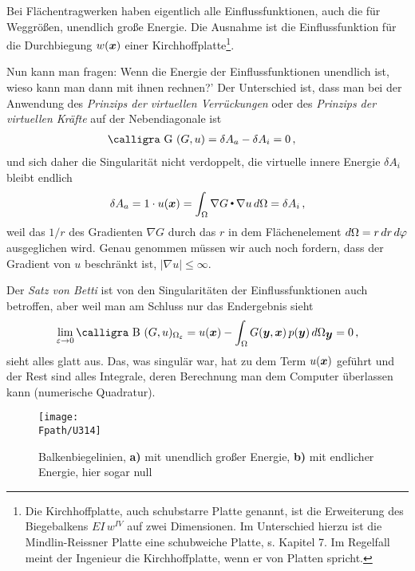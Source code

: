{{{{{Bei Fl\"{a}chentragwerken haben eigentlich alle Einflussfunktionen, auch die f\"{u}r Weggr\"{o}{\ss}en, unendlich gro{\ss}e Energie. Die Ausnahme ist die Einflussfunktion f\"{u}r die Durchbiegung $w(\mbox{\boldmath $x$})$ einer Kirchhoffplatte\footnote{Die Kirchhoffplatte, auch schubstarre Platte genannt, ist die Erweiterung des Biegebalkens $EI\,w^{IV}$ auf zwei Dimensionen. Im Unterschied hierzu ist die Mindlin-Reissner Platte eine schubweiche Platte, s. Kapitel 7. Im Regelfall meint der Ingenieur die Kirchhoffplatte, wenn er von Platten spricht. }.

Nun kann man fragen: \glq Wenn die Energie der Einflussfunktionen unendlich ist, wieso kann man dann mit ihnen rechnen?' Der Unterschied ist, dass man bei der Anwendung des {\em Prinzips der virtuellen Verr\"{u}ckungen\/} oder des {\em Prinzips der virtuellen Kr\"{a}fte\/} auf der { Nebendiagonale} ist
\begin{align}
\text{\normalfont\calligra G\,\,}(G,u) &= \delta A_a - \delta A_i = 0\,,
\end{align}
und sich daher die Singularit\"{a}t nicht verdoppelt, die virtuelle innere Energie $\delta A_i$ bleibt endlich
\begin{align}
\delta A_a = 1 \cdot u(\mbox{\boldmath $x$}) = \int_{\Omega}  \nabla G {\,\scriptscriptstyle \stackrel{\bullet}{{}}}\,  \nabla u \,d\Omega = \delta A_i\,,
\end{align}
weil das $1/r$ des Gradienten $\nabla G$ durch das $r$ in dem Fl\"{a}chenelement $d\Omega = r\,dr\,d\varphi$ ausgeglichen wird. Genau genommen m\"{u}ssen wir auch noch fordern, dass der Gradient von $u$ beschr\"{a}nkt ist, $|\nabla u| \leq \infty$.

Der {\em Satz von Betti\/} ist von den Singularit\"{a}ten der Einflussfunktionen auch betroffen, aber weil man am Schluss nur das Endergebnis sieht
\begin{align}
\lim_{\varepsilon \to 0} \text{\normalfont\calligra B\,\,}(G,u)_{\Omega_\varepsilon} = u(\vek x) -\int_{\Omega} G(\vek y,\vek x)\,p(\vek y)\,d\Omega_{\vek y} = 0\,,
\end{align}
sieht alles glatt aus. Das, was singul\"{a}r war, hat zu dem Term $u(\mbox{\boldmath $x$})$ gef\"{u}hrt und der Rest sind alles Integrale, deren Berechnung man dem Computer \"{u}berlassen kann (numerische Quadratur).\\


\begin{figure}[tbp]
\centering
\if {} \sidecaption \fi
\texttt{[image: \\Fpath/U314]}
\caption{Balkenbiegelinien,  \textbf{ a)} mit unendlich gro{\ss}er Energie, \textbf{ b)} mit endlicher Energie, hier sogar null}
\label{U314}
\end{figure}%

}}}}}
